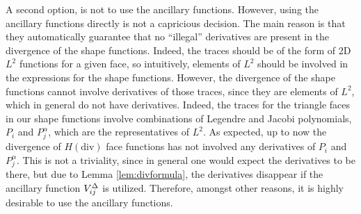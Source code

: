 A second option, is not to use the ancillary functions.
However, using the ancillary functions directly is not a capricious decision.
The main reason is that they automatically guarantee that no ``illegal'' derivatives are present in the divergence of the shape functions.
Indeed, the traces should be of the form of 2D $L^2$ functions for a given face, so intuitively, elements of $L^2$ should be involved in the expressions for the shape functions.
However, the divergence of the shape functions cannot involve derivatives of those traces, since they are elements of $L^2$, which in general do not have derivatives.
Indeed, the traces for the triangle faces in our shape functions involve combinations of Legendre and Jacobi polynomials, $P_i$ and $P_j^\alpha$, which are the representatives of $L^2$. 
As expected, up to now the divergence of $H(\mathrm{div})$ face functions has not involved any derivatives of $P_i$ and $P_j^\alpha$.
This is not a triviality, since in general one would expect the derivatives to be there, but due to Lemma \ref{lem:divformula}, the derivatives disappear if the ancillary function $V_{ij}^\Delta$ is utilized.
Therefore, amongst other reasons, it is highly desirable to use the ancillary functions.

